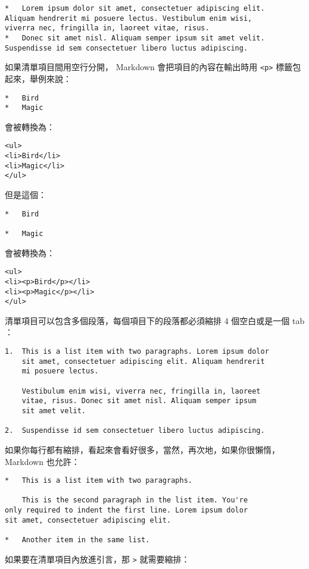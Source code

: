 \begin{verbatim}
*   Lorem ipsum dolor sit amet, consectetuer adipiscing elit.
Aliquam hendrerit mi posuere lectus. Vestibulum enim wisi,
viverra nec, fringilla in, laoreet vitae, risus.
*   Donec sit amet nisl. Aliquam semper ipsum sit amet velit.
Suspendisse id sem consectetuer libero luctus adipiscing.
\end{verbatim}
如果清單項目間用空行分開， Markdown 會把項目的內容在輸出時用
\texttt{\textless{}p\textgreater{}} 標籤包起來，舉例來說：

\begin{verbatim}
*   Bird
*   Magic
\end{verbatim}
會被轉換為：

\begin{verbatim}
<ul>
<li>Bird</li>
<li>Magic</li>
</ul>
\end{verbatim}
但是這個：

\begin{verbatim}
*   Bird

*   Magic
\end{verbatim}
會被轉換為：

\begin{verbatim}
<ul>
<li><p>Bird</p></li>
<li><p>Magic</p></li>
</ul>
\end{verbatim}
清單項目可以包含多個段落，每個項目下的段落都必須縮排 4 個空白或是一個 tab
：

\begin{verbatim}
1.  This is a list item with two paragraphs. Lorem ipsum dolor
    sit amet, consectetuer adipiscing elit. Aliquam hendrerit
    mi posuere lectus.

    Vestibulum enim wisi, viverra nec, fringilla in, laoreet
    vitae, risus. Donec sit amet nisl. Aliquam semper ipsum
    sit amet velit.

2.  Suspendisse id sem consectetuer libero luctus adipiscing.
\end{verbatim}
如果你每行都有縮排，看起來會看好很多，當然，再次地，如果你很懶惰，Markdown
也允許：

\begin{verbatim}
*   This is a list item with two paragraphs.

    This is the second paragraph in the list item. You're
only required to indent the first line. Lorem ipsum dolor
sit amet, consectetuer adipiscing elit.

*   Another item in the same list.
\end{verbatim}
如果要在清單項目內放進引言，那 \texttt{\textgreater{}} 就需要縮排：

